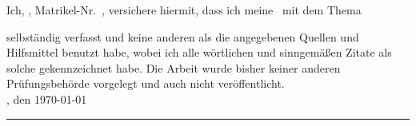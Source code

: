 %
\newpage



\vspace{2cm}

\noindent Ich, \autor, Matrikel-Nr.\ \matrikelnr, versichere hiermit, dass ich meine \arbeitsart\ mit dem Thema
\begin{quote}
\textit{\arbeitstitel}
\end{quote}
selbständig verfasst und keine anderen als die angegebenen Quellen und Hilfsmittel benutzt habe, wobei ich alle wörtlichen und sinngemäßen Zitate als solche gekennzeichnet habe. Die Arbeit wurde bisher keiner anderen Prüfungsbehörde vorgelegt und auch nicht veröffentlicht.\\[6ex]

\ort, den \today\\

\rule[-0.2cm]{5cm}{0.5pt}

\textsc{\autor} 


\begin{appendix}
\clearpage
{}
%
\end{appendix}




